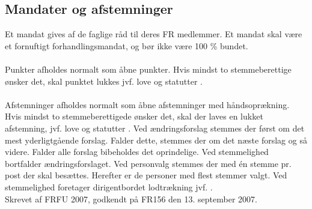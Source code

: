 \subsection{Mandater og afstemninger}
Et mandat gives af de faglige råd til deres FR medlemmer. Et mandat skal være et fornuftigt forhandlingsmandat, og bør
ikke være 100 \% bundet.\\
\\
Punkter afholdes normalt som åbne punkter. Hvis mindst to stemmeberettige ønsker det, skal punktet lukkes jvf. love og
statutter .\\
\\
Afstemninger afholdes normalt som åbne afstemninger med håndsoprækning. Hvis mindst to stemmeberettigede ønsker
det, skal der laves en lukket afstemning, jvf. love og statutter .
Ved ændringsforslag stemmes der først om det mest yderligtgående forslag. Falder dette, stemmes der om det næste
forslag og så videre. Falder alle forslag bibeholdes det oprindelige. Ved stemmelighed bortfalder ændringsforslaget.
Ved personvalg stemmes der med én stemme pr. post der skal besættes. Herefter er de personer med flest stemmer valgt.
Ved stemmelighed foretager dirigentbordet lodtrækning jvf. .\\

Skrevet af FRFU 2007, godkendt på FR156 den 13. september 2007.
